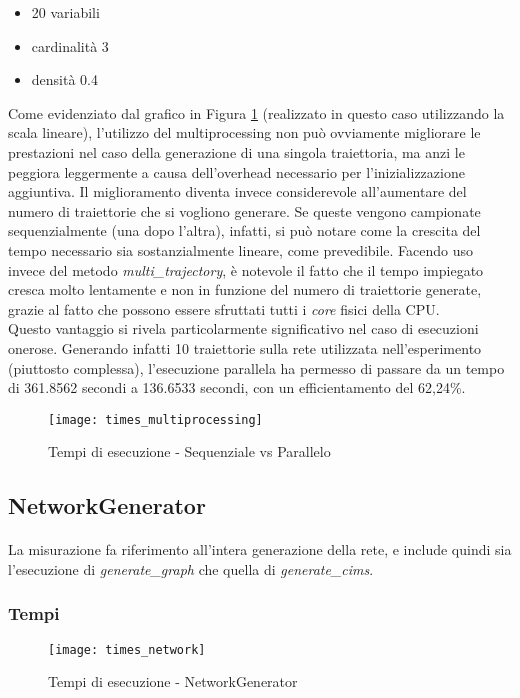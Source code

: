   \begin{itemize}
    \item 20 variabili
    \item cardinalità 3
    \item densità 0.4
  \end{itemize}

  Come evidenziato dal grafico in Figura \ref{fig:seq_vs_par} (realizzato in questo caso utilizzando la scala lineare), 
  l'utilizzo del multiprocessing non può ovviamente migliorare le prestazioni nel caso della generazione di una singola traiettoria,
  ma anzi le peggiora leggermente a causa dell'overhead necessario per l'inizializzazione aggiuntiva.
  Il miglioramento diventa invece considerevole all'aumentare del numero di traiettorie che si vogliono generare.
  Se queste vengono campionate sequenzialmente (una dopo l'altra), infatti, si può notare come
  la crescita del tempo necessario sia sostanzialmente lineare, come prevedibile. Facendo uso invece
  del metodo \textit{multi\_trajectory}, è notevole il fatto che il tempo impiegato cresca molto lentamente
  e non in funzione del numero di traiettorie generate, grazie al fatto che 
  possono essere sfruttati tutti i \textit{core} fisici della CPU.\\
  Questo vantaggio si rivela particolarmente significativo nel caso di esecuzioni onerose.
  Generando infatti 10 traiettorie sulla rete utilizzata nell'esperimento (piuttosto complessa),
  l'esecuzione parallela ha permesso di passare da un tempo di 361.8562 secondi a 136.6533 secondi, con un
  efficientamento del 62,24\%.

  \begin{figure}[H]
    \texttt{[image: times\_multiprocessing]}
    \centering
    \caption{Tempi di esecuzione - Sequenziale vs Parallelo}
    \label{fig:seq_vs_par}
  \end{figure}

  \subsection{NetworkGenerator}
  \paragraph{}
  La misurazione fa riferimento all'intera generazione della rete, e include quindi sia l'esecuzione 
  di \textit{generate\_graph} che quella di \textit{generate\_cims}. 

  \subsubsection{Tempi}
  \begin{figure}[H]
    \texttt{[image: times\_network]}
    \centering
    \caption{Tempi di esecuzione - NetworkGenerator}
  \end{figure}

